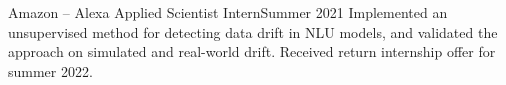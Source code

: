   {Amazon -- Alexa Applied Scientist Intern}{Summer 2021}{
Implemented an unsupervised method for detecting data drift in NLU models, and
validated the approach on simulated and real-world drift. Received return internship offer for summer 2022.}{}
\vspace{1mm}